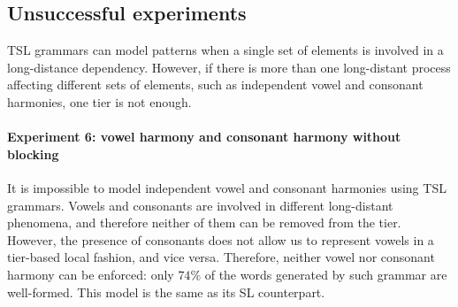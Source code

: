 %


\subsection{Unsuccessful experiments}

TSL grammars can model patterns when a single set of elements is involved in a long-distance dependency.
However, if there is more than one long-distant process affecting different sets of elements, such as independent vowel and consonant harmonies, one tier is not enough.


\paragraph{Experiment 6: vowel harmony and consonant harmony without blocking}

It is impossible to model independent vowel and consonant harmonies using TSL grammars.
Vowels and consonants are involved in different long-distant phenomena, and therefore neither of them can be removed from the tier.
However, the presence of consonants does not allow us to represent vowels in a tier-based local fashion, and vice versa.
Therefore, neither vowel nor consonant harmony can be enforced: only $74$\% of the words generated by such grammar are well-formed.
This model is the same as its SL counterpart.

